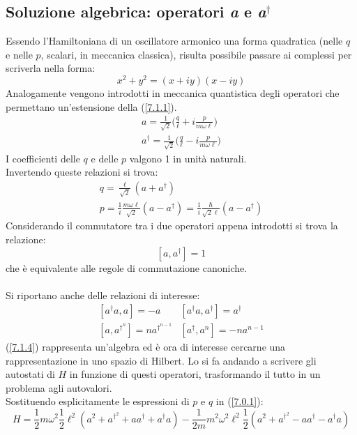\documentclass[twoside]{article}
\begin{document}
\subsection{Soluzione algebrica: operatori \textit{a} e \textit{a}\texorpdfstring{$^\dagger$}{Lg}}
Essendo l'Hamiltoniana di un oscillatore armonico una forma quadratica (nelle $q$ e nelle $p$, scalari, in meccanica classica), risulta possibile passare ai complessi per scriverla nella forma:
\begin{equation} \label{7.1.1}
    x^2 + y^2 =(x+iy)(x-iy)
\end{equation}
Analogamente vengono introdotti in meccanica quantistica degli operatori che permettano un'estensione della (\ref{7.1.1}).
\begin{equation} \label{7.1.2} \begin{split}
    a=\frac{1}{\sqrt{2}}\biggl( \frac{q}{\ell}+i\frac{p}{m \omega \ell} \biggr) \\
     a^{\dagger}=\frac{1}{\sqrt{2}}\biggl( \frac{q}{\ell}-i\frac{p}{m \omega \ell} \biggr)
\end{split} \end{equation}
I coefficienti delle $q$ e delle $p$ valgono 1 in unità naturali.
\\
Invertendo queste relazioni si trova:
\begin{equation}
     \begin{array}{lr} 
        q=\frac{\ell}{\sqrt{2}}(a+ a^{\dagger}) \\ 
        p=\frac{1}{i}\frac{m \omega \ell}{\sqrt{2}}(a-a^{\dagger})=\frac{1}{i}\frac{\hbar}{\sqrt{2}\ell}(a-a^{\dagger})
  \end{array}
\end{equation}
Considerando il commutatore tra i due operatori appena introdotti si trova la relazione:
\begin{equation} \label{7.1.4}
    [a,a^{\dagger}]=1
\end{equation}
che è equivalente alle regole di commutazione canoniche.
\\ \\
Si riportano anche delle relazioni di interesse:
\begin{equation} \label{7.1.5}
    \begin{matrix}
    [a^{\dagger}a,a]=-a & [a^{\dagger}a,a^{\dagger}]=a^{\dagger} \\
    [a,a^{\dagger^n}]=na^{\dagger^{n-1}} & [a^{\dagger},a^n]=-na^{n-1}
    \end{matrix}
\end{equation}
(\ref{7.1.4}) rappresenta un'algebra ed è ora di interesse cercarne una rappresentazione in uno spazio di Hilbert. Lo si fa andando a scrivere gli autostati di $H$ in funzione di questi operatori, trasformando il tutto in un problema agli autovalori.
\\
Sostituendo esplicitamente le espressioni di $p$ e $q$ in (\ref{7.0.1}):
\begin{equation}
    H=\frac{1}{2}m \omega^2
\frac{1}{2}\ell^2(a^2+a^{\dagger^2}+aa^{\dagger}+a^{\dagger}a)-\frac{1}{2m}m^2 \omega^2 \ell^2 \frac{1}{2}(a^2+a^{\dagger^2}-aa^{\dagger}-a^{\dagger}a)
\end{equation}
\end{document}
